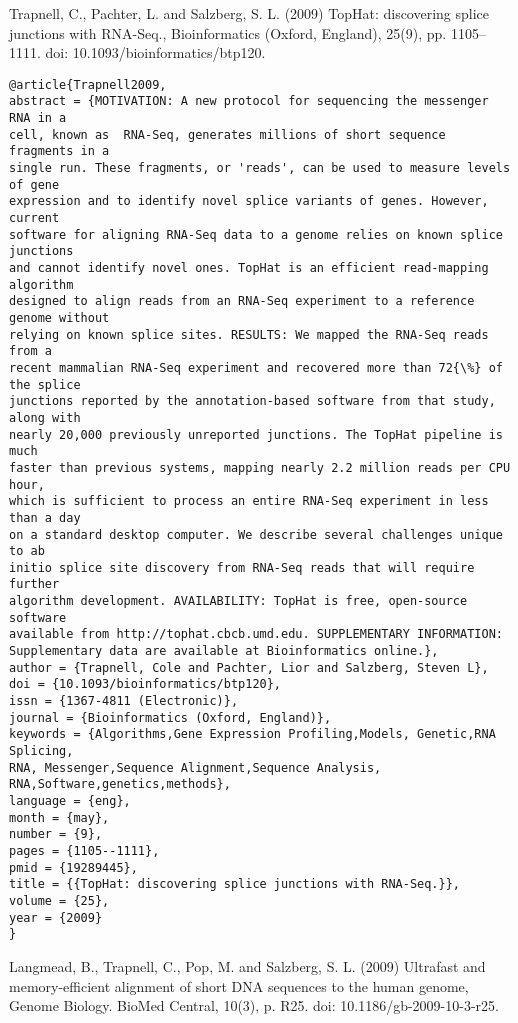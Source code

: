 \documentclass[]{article}
\begin{document}
Trapnell, C., Pachter, L. and Salzberg, S. L. (2009) TopHat: discovering splice junctions with RNA-Seq., Bioinformatics (Oxford, England), 25(9), pp. 1105–1111. doi: 10.1093/bioinformatics/btp120.

\begin{verbatim}
@article{Trapnell2009,
abstract = {MOTIVATION: A new protocol for sequencing the messenger RNA in a
cell, known as  RNA-Seq, generates millions of short sequence fragments in a
single run. These fragments, or 'reads', can be used to measure levels of gene
expression and to identify novel splice variants of genes. However, current
software for aligning RNA-Seq data to a genome relies on known splice junctions
and cannot identify novel ones. TopHat is an efficient read-mapping algorithm
designed to align reads from an RNA-Seq experiment to a reference genome without
relying on known splice sites. RESULTS: We mapped the RNA-Seq reads from a
recent mammalian RNA-Seq experiment and recovered more than 72{\%} of the splice
junctions reported by the annotation-based software from that study, along with
nearly 20,000 previously unreported junctions. The TopHat pipeline is much
faster than previous systems, mapping nearly 2.2 million reads per CPU hour,
which is sufficient to process an entire RNA-Seq experiment in less than a day
on a standard desktop computer. We describe several challenges unique to ab
initio splice site discovery from RNA-Seq reads that will require further
algorithm development. AVAILABILITY: TopHat is free, open-source software
available from http://tophat.cbcb.umd.edu. SUPPLEMENTARY INFORMATION:
Supplementary data are available at Bioinformatics online.},
author = {Trapnell, Cole and Pachter, Lior and Salzberg, Steven L},
doi = {10.1093/bioinformatics/btp120},
issn = {1367-4811 (Electronic)},
journal = {Bioinformatics (Oxford, England)},
keywords = {Algorithms,Gene Expression Profiling,Models, Genetic,RNA Splicing,
RNA, Messenger,Sequence Alignment,Sequence Analysis, RNA,Software,genetics,methods},
language = {eng},
month = {may},
number = {9},
pages = {1105--1111},
pmid = {19289445},
title = {{TopHat: discovering splice junctions with RNA-Seq.}},
volume = {25},
year = {2009}
}

\end{verbatim}

Langmead, B., Trapnell, C., Pop, M. and Salzberg, S. L. (2009) Ultrafast and memory-efficient alignment of short DNA sequences to the human genome, Genome Biology. BioMed Central, 10(3), p. R25. doi: 10.1186/gb-2009-10-3-r25.
\end{document}
